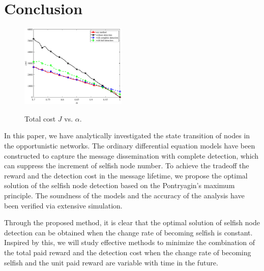 \section{Conclusion}
\label{sec:conclude}
\begin{figure}
  \centering
  {\includegraphics[width=0.45\textwidth]{fig/cost_vs_alpha.eps}}
     \caption{Total cost $J$ vs. $\alpha$.}
     \label{fig:cost_alpha}
\end{figure}
In this paper, we have analytically investigated
the state transition of nodes in the opportunistic networks.
The ordinary differential equation models have been constructed to
capture the message dissemination with complete detection,
which can suppress the increment of selfish node number.
To achieve the tradeoff the reward and the detection cost
in the message lifetime,
we propose the optimal solution of the selfish node detection
based on the Pontryagin's maximum principle.
The soundness of the models and the accuracy of the analysis
have been verified via extensive simulation.

Through the proposed method,
it is clear that the optimal solution of selfish node detection
can be obtained
when the change rate of becoming selfish is constant.
Inspired by this,
we will study effective methods
to minimize the combination of
the total paid reward and the detection cost
when the change rate of becoming selfish
and the unit paid reward
are variable with time in the future.
